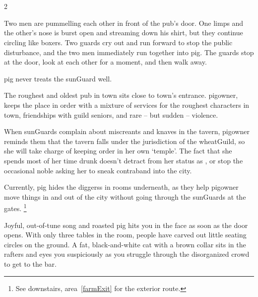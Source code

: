 \section{}

\begin{multicols}{2}

\begin{boxtext}
  Two men are pummelling each other in front of the pub's door.
   One limps and the other's nose is burst open and streaming down his shirt, but they continue circling like boxers.
   Two guards cry out and run forward to stop the public disturbance, and the two men immediately run together into \gls{pig}.
   The guards stop at the door, look at each other for a moment, and then walk away.

  \Gls{pig} never treats the \gls{sunGuard} well.
\end{boxtext}
 
The roughest and oldest pub in \gls{town} sits close to \gls{town}'s entrance.
\Gls{pigowner}, keeps the place in order with a mixture of services for the roughest characters in \gls{town}, friendships with guild seniors, and rare -- but sudden -- violence.

When \glspl{sunGuard} complain about miscreants and knaves in the tavern, \gls{pigowner} reminds them that the tavern falls under the jurisdiction of the \gls{wheatGuild}, so she will take charge of keeping order in her own `temple'.
The fact that she spends most of her time drunk doesn't detract from her status as , or stop the occasional noble asking her to sneak contraband into the city.

Currently, \gls{pig} hides the \glspl{diggers} in rooms underneath, as they help \gls{pigowner} move things in and out of the city without going through the \glspl{sunGuard} at the gates.%
\footnote{See downstairs, \gls{area}~\vref{farmExit} for the exterior route.}


\begin{boxtext}
  Joyful, out-of-tune song and roasted pig hits you in the face as soon as the door opens.
  With only three tables in the room, people have carved out little seating circles on the ground.
  A fat, black-and-white cat with a brown collar sits in the rafters and eyes you suspiciously as you struggle through the disorganized crowd to get to the bar.
\end{boxtext}
\label{pigCat}



\end{multicols}
